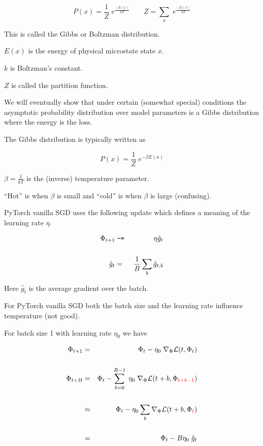 {{\vfill
$$P(x) = \frac{1}{Z} \;e^{\frac{-E(x)}{kT}} \;\;\;\;\;\;\;Z = \sum_x\; e^{\frac{-E(x)}{kT}}$$

\vfill
This is called the Gibbs or Boltzman distribution.

\vfill
$E(x)$ is the energy of physical microstate state $x$.


\vfill
$k$ is Boltzman's constant.

\vfill
$Z$ is called the partition function.

\vfill
We will eventually show that under certain (somewhat special) conditions the asymptotic probability distribution over model parameters is a Gibbs distribution
where the energy is the loss.
}


The Gibbs distribution is typically written as

$$P(x) = \frac{1}{Z}\;e^{-\beta E(x)}$$

\vfill

$\beta = \frac{1}{kT}$ is the (inverse) temperature parameter.

\vfill
``Hot'' is when $\beta$ is small and ``cold'' is when $\beta$ is large (confusing).


PyTorch vanilla SGD uses the following update which defines a meaning of the learning rate $\eta$.

\begin{eqnarray*}
\Phi_{t+1} & \;\mbox{\tt -=}\; & \eta \hat{g}_t \\
\\
\hat{g}_t & = & \frac{1}{B} \sum_b \hat{g}_{t,b}
\end{eqnarray*}

\vfill
Here $\hat{g}_{t}$ is the average gradient over the batch.

\vfill
For PyTorch vanilla SGD both the batch size and the learning rate influence temperature (not good).


{\huge
For batch size 1 with learning rate $\eta_0$ we have

\begin{eqnarray*}
\Phi_{t+1} & = &  \Phi_{t} - \eta_0\;\nabla_\Phi {\cal L}(t,\Phi_{t}) \\
\\
\Phi_{t+B} & = &  \Phi_{t} - \sum_{b=0}^{B-1} \;\eta_0\;\nabla_\Phi {\cal L}(t+b,\Phi_{\color{red} t+b-1}) \\
\\
& \approx & \Phi_t - \eta_0 \sum_b \nabla_\Phi {\cal L}(t+b,\Phi_{\color{red} t}) \\
\\
& = & \Phi_t - B\eta_0\; \hat{g}_t
\end{eqnarray*}

}}
